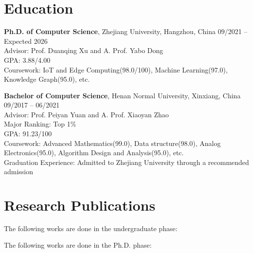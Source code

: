 \documentclass[a4paper,12pt]{article}
\begin{document}
\section{Education}

{\bf Ph.D. of Computer Science}, Zhejiang University, Hangzhou, China \hfill {09/2021 -- Expected 2026}\\
Advisor: Prof. Duanqing Xu and A. Prof. Yabo Dong\\
GPA: 3.88/4.00\\
Coursework: IoT and Edge Computing(98.0/100), Machine Learning(97.0), Knowledge Graph(95.0), etc.

{\bf Bachelor of Computer Science}, Henan Normal University, Xinxiang, China \hfill {09/2017 -- 06/2021}\\
Advisor: Prof. Peiyan Yuan and A. Prof. Xiaoyan Zhao\\
Major Ranking: Top 1\%  \\
GPA: 91.23/100\\
Coursework: Advanced Mathematics(99.0), Data structure(98.0), Analog Electronics(95.0), Algorithm Design and Analysis(95.0), etc.\\
Graduation Experience: Admitted to Zhejiang University through a recommended admission




\section{Research Publications }
The following works are done in the undergraduate phase:
\begin{refsection}
\nocite{*}

\printbibliography[heading=none]
\end{refsection}

The following works are done in the Ph.D. phase:
    \begin{refsection}
    \nocite{*}
    \printbibliography[heading=none]
    \end{refsection}

\end{document}
